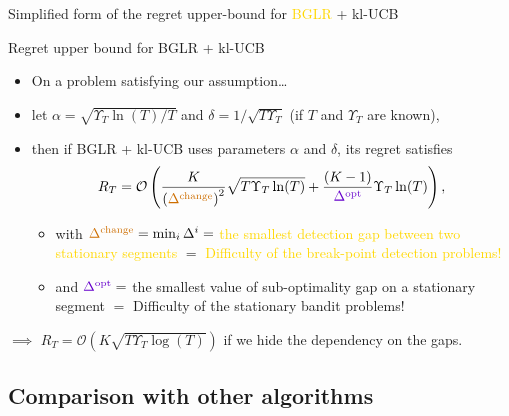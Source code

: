\documentclass[11pt,english,ignorenonframetext,]{beamer}
\providecommand{\tightlist}{%
  \setlength{\itemsep}{0pt}\setlength{\parskip}{0pt}}
\begin{document}
\begin{frame}{Simplified form of the regret upper-bound for \textcolor{gold}{BGLR} + \textcolor{deeppurple}{kl-UCB}}

  \begin{block}{Regret upper bound for BGLR + kl-UCB \dCooley{}}
    \begin{itemize}
      \item
      On a problem satisfying our assumption\ldots
      \item
      let $\alpha = \sqrt{\Upsilon_T \ln(T) / T}$ and $\delta = 1 / \sqrt{T \Upsilon_T}$ (if $T$ and $\Upsilon_T$ are known),
      \pause
      \item
      then if BGLR + kl-UCB uses parameters $\alpha$ and $\delta$, its regret satisfies
      \[ R_T =\mathcal{O}\left( \frac{K}{\left(\textcolor{gold}{\Delta^{\text{change}}}\right)^2}\sqrt{T \Upsilon_T \ln(T)} + \frac{(K-1)}{\textcolor{deeppurple}{\Delta^{\text{opt}}}} \Upsilon_T\ln(T) \right),\]
      \begin{itemize}\tightlist
        \item
        with $\textcolor{gold}{\Delta^{\text{change}}} = \min_{i} \Delta^{i} =$ \textcolor{gold}{the smallest detection gap between two stationary segments}
        $=$ \textcolor{gold}{Difficulty of the break-point detection problems!}
        \item
        and $\textcolor{deeppurple}{\Delta^{\text{opt}}} =$
        \textcolor{deeppurple}{the smallest value of sub-optimality gap on a stationary segment}
        $=$ \textcolor{deeppurple}{Difficulty of the stationary bandit problems!}
      \end{itemize}
    \end{itemize}
  \end{block}

\pause
$\implies$ $R_T = \mathcal{O}(K \sqrt{T \Upsilon_T \log(T)})$ if we hide the dependency on the gaps.

\end{frame}


\subsection{\hfill{}Comparison with other algorithms\hfill{}}
\end{document}

